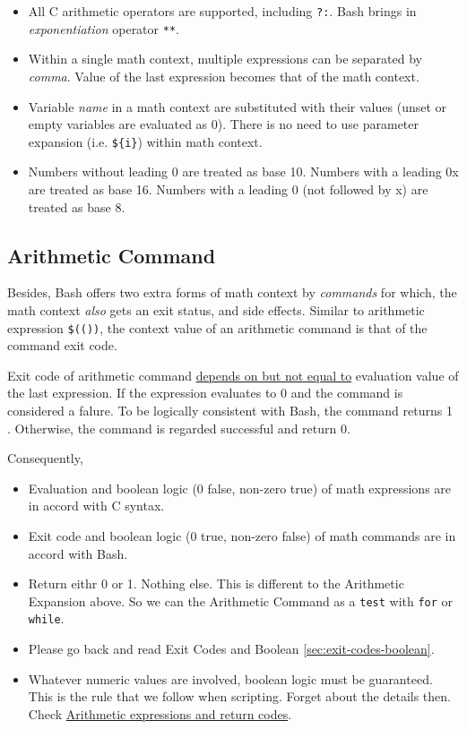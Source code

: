 \begin{itemize}
\item All C arithmetic operators are supported, including
  \verb|?:|. Bash brings in \textit{exponentiation} operator
  \verb|**|.
\item Within a single math context, multiple expressions can be
  separated by \textit{comma}. Value of the last expression
  becomes that of the math context.
\item Variable \textit{name} in a math context are substituted
  with their values (unset or empty variables are evaluated as
  0). There is no need to use parameter expansion
  (i.e. \verb|${i}|) within math context.
\item Numbers without leading 0 are treated as base 10. Numbers
  with a leading 0x are treated as base 16. Numbers with a leading
  0 (not followed by x) are treated as base 8.
\end{itemize}

\subsection{Arithmetic Command}
\label{sec:bash-arithmetic-command}

Besides, Bash offers two extra forms of math context by
\textit{commands} for which, the math context \textit{also} gets
an exit status, and side effects. Similar to arithmetic expression
\lstinline|$(())|, the context value of an arithmetic command is
that of the command exit code.

Exit code of arithmetic command \uline{depends on but not equal
  to} evaluation value of the last expression. If the
expression evaluates to 0 and the command is considered a falure. To
be logically consistent with Bash, the command returns 1
. Otherwise, the command is regarded successful and return
0.

Consequently,

\begin{itemize}
\item Evaluation and boolean logic (0 false, non-zero true) of
  math expressions are in accord with C syntax.
\item Exit code and boolean logic (0 true, non-zero false) of math
  commands are in accord with Bash.
\item Return eithr 0 or 1. Nothing else. This is different to the
  Arithmetic Expansion above. So we can the Arithmetic Command as
  a \lstinline|test| with \lstinline|for| or \lstinline|while|.
\item Please go back and read Exit Codes and Boolean
  \ref{sec:exit-codes-boolean}.
\item Whatever numeric values are involved, boolean logic must be
  guaranteed. This is the rule that we follow when
  scripting. Forget about the details then. Check
  \href{https://wiki.bash-hackers.org/syntax/arith_expr#arithmetic_expressions_and_return_codes}{Arithmetic
    expressions and return codes}.
\end{itemize}

